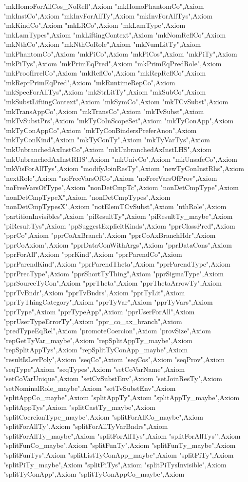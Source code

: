 {"mkHomoForAllCos_NoRefl"},{Axiom "mkHomoPhantomCo"},{Axiom "mkInstCo"},{Axiom "mkInvForAllTy"},{Axiom "mkInvForAllTys"},{Axiom "mkKindCo"},{Axiom "mkLRCo"},{Axiom "mkLamType"},{Axiom "mkLamTypes"},{Axiom "mkLiftingContext"},{Axiom "mkNomReflCo"},{Axiom "mkNthCo"},{Axiom "mkNthCoRole"},{Axiom "mkNumLitTy"},{Axiom "mkPhantomCo"},{Axiom "mkPiCo"},{Axiom "mkPiCos"},{Axiom "mkPiTy"},{Axiom "mkPiTys"},{Axiom "mkPrimEqPred"},{Axiom "mkPrimEqPredRole"},{Axiom "mkProofIrrelCo"},{Axiom "mkReflCo"},{Axiom "mkRepReflCo"},{Axiom "mkReprPrimEqPred"},{Axiom "mkRuntimeRepCo"},{Axiom "mkSpecForAllTys"},{Axiom "mkStrLitTy"},{Axiom "mkSubCo"},{Axiom "mkSubstLiftingContext"},{Axiom "mkSymCo"},{Axiom "mkTCvSubst"},{Axiom "mkTransAppCo"},{Axiom "mkTransCo"},{Axiom "mkTvSubst"},{Axiom "mkTvSubstPrs"},{Axiom "mkTyCoInScopeSet"},{Axiom "mkTyConApp"},{Axiom "mkTyConAppCo"},{Axiom "mkTyConBindersPreferAnon"},{Axiom "mkTyConKind"},{Axiom "mkTyConTy"},{Axiom "mkTyVarTys"},{Axiom "mkUnbranchedAxInstCo"},{Axiom "mkUnbranchedAxInstLHS"},{Axiom "mkUnbranchedAxInstRHS"},{Axiom "mkUnivCo"},{Axiom "mkUnsafeCo"},{Axiom "mkVisForAllTys"},{Axiom "modifyJoinResTy"},{Axiom "newTyConInstRhs"},{Axiom "nextRole"},{Axiom "noFreeVarsOfCo"},{Axiom "noFreeVarsOfProv"},{Axiom "noFreeVarsOfType"},{Axiom "nonDetCmpTc"},{Axiom "nonDetCmpType"},{Axiom "nonDetCmpTypeX"},{Axiom "nonDetCmpTypes"},{Axiom "nonDetCmpTypesX"},{Axiom "notElemTCvSubst"},{Axiom "nthRole"},{Axiom "partitionInvisibles"},{Axiom "piResultTy"},{Axiom "piResultTy_maybe"},{Axiom "piResultTys"},{Axiom "ppSuggestExplicitKinds"},{Axiom "pprClassPred"},{Axiom "pprCo"},{Axiom "pprCoAxBranch"},{Axiom "pprCoAxBranchHdr"},{Axiom "pprCoAxiom"},{Axiom "pprDataConWithArgs"},{Axiom "pprDataCons"},{Axiom "pprForAll"},{Axiom "pprKind"},{Axiom "pprParendCo"},{Axiom "pprParendKind"},{Axiom "pprParendTheta"},{Axiom "pprParendType"},{Axiom "pprPrecType"},{Axiom "pprShortTyThing"},{Axiom "pprSigmaType"},{Axiom "pprSourceTyCon"},{Axiom "pprTheta"},{Axiom "pprThetaArrowTy"},{Axiom "pprTvBndr"},{Axiom "pprTvBndrs"},{Axiom "pprTyLit"},{Axiom "pprTyThingCategory"},{Axiom "pprTyVar"},{Axiom "pprTyVars"},{Axiom "pprType"},{Axiom "pprTypeApp"},{Axiom "pprUserForAll"},{Axiom "pprUserTypeErrorTy"},{Axiom "ppr_co_ax_branch"},{Axiom "predTypeEqRel"},{Axiom "promoteCoercion"},{Axiom "provSize"},{Axiom "repGetTyVar_maybe"},{Axiom "repSplitAppTy_maybe"},{Axiom "repSplitAppTys"},{Axiom "repSplitTyConApp_maybe"},{Axiom "resultIsLevPoly"},{Axiom "seqCo"},{Axiom "seqCos"},{Axiom "seqProv"},{Axiom "seqType"},{Axiom "seqTypes"},{Axiom "setCoVarName"},{Axiom "setCoVarUnique"},{Axiom "setCvSubstEnv"},{Axiom "setJoinResTy"},{Axiom "setNominalRole_maybe"},{Axiom "setTvSubstEnv"},{Axiom "splitAppCo_maybe"},{Axiom "splitAppTy"},{Axiom "splitAppTy_maybe"},{Axiom "splitAppTys"},{Axiom "splitCastTy_maybe"},{Axiom "splitCoercionType_maybe"},{Axiom "splitForAllCo_maybe"},{Axiom "splitForAllTy"},{Axiom "splitForAllTyVarBndrs"},{Axiom "splitForAllTy_maybe"},{Axiom "splitForAllTys"},{Axiom "splitForAllTys'"},{Axiom "splitFunCo_maybe"},{Axiom "splitFunTy"},{Axiom "splitFunTy_maybe"},{Axiom "splitFunTys"},{Axiom "splitListTyConApp_maybe"},{Axiom "splitPiTy"},{Axiom "splitPiTy_maybe"},{Axiom "splitPiTys"},{Axiom "splitPiTysInvisible"},{Axiom "splitTyConApp"},{Axiom "splitTyConAppCo_maybe"},{Axiom }
